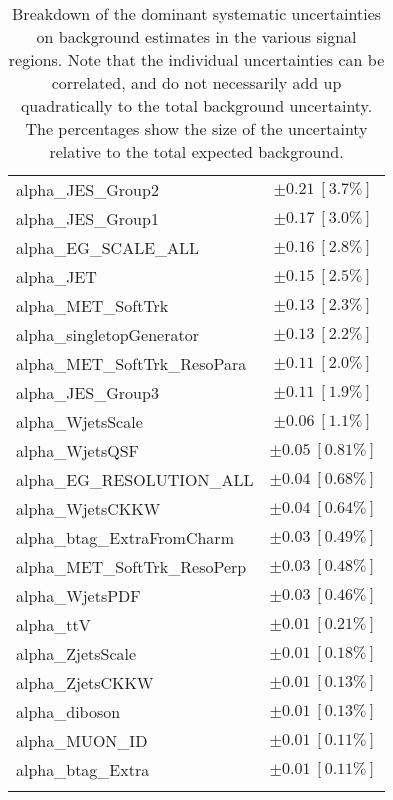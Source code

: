 \begin{table}
\begin{center}
\begin{tabular*}{\textwidth}{@{\extracolsep{\fill}}lc}
alpha\_JES\_Group2         & $\pm 0.21\ [3.7\%] $       \\
alpha\_JES\_Group1         & $\pm 0.17\ [3.0\%] $       \\
alpha\_EG\_SCALE\_ALL         & $\pm 0.16\ [2.8\%] $       \\
alpha\_JET         & $\pm 0.15\ [2.5\%] $       \\
alpha\_MET\_SoftTrk         & $\pm 0.13\ [2.3\%] $       \\
alpha\_singletopGenerator         & $\pm 0.13\ [2.2\%] $       \\
alpha\_MET\_SoftTrk\_ResoPara         & $\pm 0.11\ [2.0\%] $       \\
alpha\_JES\_Group3         & $\pm 0.11\ [1.9\%] $       \\
alpha\_WjetsScale         & $\pm 0.06\ [1.1\%] $       \\
alpha\_WjetsQSF         & $\pm 0.05\ [0.81\%] $       \\
alpha\_EG\_RESOLUTION\_ALL         & $\pm 0.04\ [0.68\%] $       \\
alpha\_WjetsCKKW         & $\pm 0.04\ [0.64\%] $       \\
alpha\_btag\_ExtraFromCharm         & $\pm 0.03\ [0.49\%] $       \\
alpha\_MET\_SoftTrk\_ResoPerp         & $\pm 0.03\ [0.48\%] $       \\
alpha\_WjetsPDF         & $\pm 0.03\ [0.46\%] $       \\
alpha\_ttV         & $\pm 0.01\ [0.21\%] $       \\
alpha\_ZjetsScale         & $\pm 0.01\ [0.18\%] $       \\
alpha\_ZjetsCKKW         & $\pm 0.01\ [0.13\%] $       \\
alpha\_diboson         & $\pm 0.01\ [0.13\%] $       \\
alpha\_MUON\_ID         & $\pm 0.01\ [0.11\%] $       \\
alpha\_btag\_Extra         & $\pm 0.01\ [0.11\%] $       \\
\noalign{\smallskip}\hline\noalign{\smallskip}
\end{tabular*}
\end{center}
\caption[Breakdown of uncertainty on background estimates]{
Breakdown of the dominant systematic uncertainties on background estimates in the various signal regions.
Note that the individual uncertainties can be correlated, and do not necessarily add up quadratically to 
the total background uncertainty. The percentages show the size of the uncertainty relative to the total expected background.
\label{table.results.bkgestimate.uncertainties.SRLMEM_cuts}}
\end{table}
%